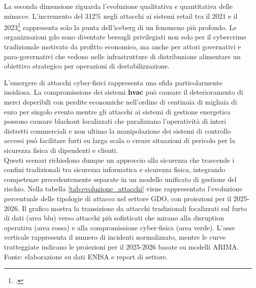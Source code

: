 La seconda dimensione riguarda l'evoluzione qualitativa e quantitativa delle minacce. L'incremento del 312\% negli attacchi ai sistemi retail tra il 2021 e il 2023\footcite{enisa2024retail} rappresenta solo la punta dell'iceberg di un fenomeno più profondo. Le organizzazioni \gls{gdo} sono diventate bersagli privilegiati non solo per il cybercrime tradizionale motivato da profitto economico, ma anche per attori governativi e para-governativi che vedono nelle infrastrutture di distribuzione alimentare un obiettivo strategico per operazioni di destabilizzazione.

L'emergere di attacchi cyber-fisici rappresenta una sfida particolarmente insidiosa. La compromissione dei sistemi \textbf{\gls{hvac}} può causare il deterioramento di merci deperibili con perdite economiche nell'ordine di centinaia di migliaia di euro per singolo evento mentre gli attacchi ai sistemi di gestione energetica possono causare blackout localizzati che paralizzano l'operatività di interi distretti commerciali e non ultimo la manipolazione dei sistemi di controllo accessi può facilitare furti su larga scala o creare situazioni di pericolo per la sicurezza fisica di dipendenti e clienti.\\ 
Questi scenari richiedono dunque un approccio alla sicurezza che trascende i confini tradizionali tra sicurezza informatica e sicurezza fisica, integrando competenze precedentemente separate in un modello unificato di gestione del rischio.
Nella tabella \ref{tab:evoluzione_attacchi} viene rappresentata l'evoluzione percentuale delle tipologie di attacco nel settore GDO, con proiezioni per il 2025-2026. Il grafico mostra la transizione da attacchi tradizionali focalizzati sul furto di dati (area blu) verso attacchi più sofisticati che mirano alla disruption operativa (area rossa) e alla compromissione cyber-fisica (area verde). L'asse verticale rappresenta il numero di incidenti normalizzato, mentre le curve tratteggiate indicano le proiezioni per il 2025-2026 basate su modelli ARIMA. Fonte: elaborazione su dati ENISA e report di settore.

